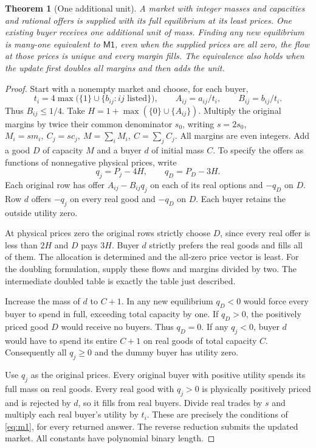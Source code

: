 \documentclass[11pt,oneside,openany,notitlepage]{report}
\newtheorem{theorem}{Theorem}[chapter]
\newcommand{\Market}{\mathsf{M1}}
\begin{document}
\begin{theorem}[One additional unit]\label{thm:update}
A market with integer masses and capacities and rational offers is
supplied with its full equilibrium at its least
prices. One existing buyer receives one additional unit of mass. Finding
any new equilibrium is many-one equivalent to \(\Market\), even when the
supplied prices are all zero, the flow at those prices is unique and every
margin fills. The equivalence also holds when the update first doubles all
margins and then adds the unit.
\end{theorem}
\begin{proof}
Start with a nonempty market and choose, for each buyer,
\[
 t_i=4\max\bigl(\{1\}\cup\{b_{ij}:ij\text{ listed}\}\bigr),\qquad
 A_{ij}=a_{ij}/t_i,\qquad B_{ij}=b_{ij}/t_i .
\]
Thus \(B_{ij}\le1/4\). Take \(H=1+\max(\{0\}\cup\{A_{ij}\})\).
Multiply the original margins by twice their common denominator \(s_0\),
writing \(s=2s_0\), \(M_i=sm_i,\ C_j=sc_j,\ M=\sum_iM_i,\ C=\sum_jC_j\).
All margins are even integers. Add a good \(D\) of capacity \(M\) and
a buyer \(d\) of initial mass \(C\). To specify the offers as functions
of nonnegative physical prices, write
\[
 q_j=P_j-4H,\qquad q_D=P_D-3H.
\]
Each original row has offer \(A_{ij}-B_{ij}q_j\) on each of its real
options and \(-q_D\) on \(D\). Row \(d\) offers \(-q_j\) on every real
good and \(-q_D\) on \(D\). Each buyer retains the outside utility zero.

At physical prices zero the original rows strictly choose \(D\), since
every real offer is less than \(2H\) and \(D\) pays \(3H\).
Buyer \(d\) strictly prefers the real goods and fills all of them.
The allocation is determined and the all-zero price vector is least.
For the doubling formulation, supply these flows and margins divided by
two. The intermediate doubled table is exactly the table just described.

Increase the mass of \(d\) to \(C+1\). In any new equilibrium \(q_D<0\)
would force every buyer to spend in full, exceeding total capacity by
one. If \(q_D>0\), the positively priced good \(D\) would receive no
buyers. Thus \(q_D=0\). If any \(q_j<0\), buyer \(d\) would have to spend
its entire \(C+1\) on real goods of total capacity \(C\). Consequently all
\(q_j\ge0\) and the dummy buyer has utility zero.

Use \(q_j\) as the original prices. Every original buyer with positive
utility spends its full mass on real goods. Every real good with
\(q_j>0\) is physically positively priced and is rejected by \(d\), so
it fills from real buyers. Divide real trades by \(s\) and multiply
each real buyer's utility by \(t_i\). These are precisely the
conditions of \eqref{eq:m1}, for every returned answer. The reverse
reduction submits the updated market. All constants have polynomial
binary length.
\end{proof}
\end{document}
